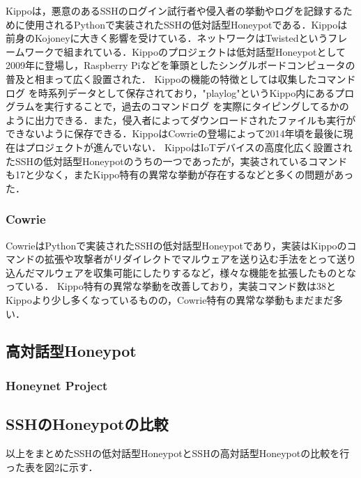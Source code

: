 Kippoは，悪意のあるSSHのログイン試行者や侵入者の挙動やログを記録するために使用されるPythonで実装されたSSHの低対話型Honeypotである\cite{kippo}．Kippoは前身のKojoney\cite{kojoney}に大きく影響を受けている．ネットワークはTwisted\cite{twisted}というフレームワークで組まれている．Kippoのプロジェクトは低対話型Honeypotとして2009年に登場し，Raspberry Pi\cite{rasp}などを筆頭としたシングルボードコンピュータ\cite{singleboard}の普及と相まって広く設置された．
Kippoの機能の特徴としては収集したコマンドログ を時系列データとして保存されており，"playlog"というKippo内にあるプログラムを実行することで，過去のコマンドログ を実際にタイピングしてるかのように出力できる．また，侵入者によってダウンロードされたファイルも実行ができないように保存できる．KippoはCowrieの登場によって2014年頃を最後に現在はプロジェクトが進んでいない．\cite{kippowiki}
KippoはIoTデバイスの高度化広く設置されたSSHの低対話型Honeypotのうちの一つであったが，実装されているコマンドも17\cite{kippocommand}と少なく，またKippo特有の異常な挙動が存在するなどと多くの問題があった．

\subsubsection{Cowrie}
\label{tech:Cowrie}
CowrieはPythonで実装されたSSHの低対話型Honeypotであり，実装はKippoのコマンドの拡張や攻撃者がリダイレクトでマルウェアを送り込む手法をとって送り込んだマルウェアを収集可能にしたりするなど，様々な機能を拡張したものとなっている．
Kippo特有の異常な挙動を改善しており，実装コマンド数は38\cite{cowriecommand}とKippoより少し多くなっているものの\cite{differfromkippo}，Cowrie特有の異常な挙動もまだまだ多い．



\subsection{高対話型Honeypot}
\label{tech:HighInteractionHoneypot}

\subsubsection{Honeynet Project}
\label{tech:Honeynet}

\subsection{SSHのHoneypotの比較}
\label{tech:CompareHoneypot}
以上をまとめたSSHの低対話型HoneypotとSSHの高対話型Honeypotの比較を行った表を図2に示す．

